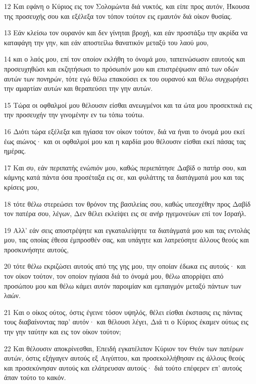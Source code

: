\par 12 Και εφάνη ο Κύριος εις τον Σολομώντα διά νυκτός, και είπε προς αυτόν, Ήκουσα της προσευχής σου και εξέλεξα τον τόπον τούτον εις εμαυτόν διά οίκον θυσίας.
\par 13 Εάν κλείσω τον ουρανόν και δεν γίνηται βροχή, και εάν προστάξω την ακρίδα να καταφάγη την γην, και εάν αποστείλω θανατικόν μεταξύ του λαού μου,
\par 14 και ο λαός μου, επί τον οποίον εκλήθη το όνομά μου, ταπεινώσωσιν εαυτούς και προσευχηθώσι και εκζητήσωσι το πρόσωπόν μου και επιστρέψωσιν από των οδών αυτών των πονηρών, τότε εγώ θέλω επακούσει εκ του ουρανού και θέλω συγχωρήσει την αμαρτίαν αυτών και θεραπεύσει την γην αυτών.
\par 15 Τώρα οι οφθαλμοί μου θέλουσιν είσθαι ανεωγμένοι και τα ώτα μου προσεκτικά εις την προσευχήν την γινομένην εν τω τόπω τούτω.
\par 16 Διότι τώρα εξέλεξα και ηγίασα τον οίκον τούτον, διά να ήναι το όνομά μου εκεί έως αιώνος· και οι οφθαλμοί μου και η καρδία μου θέλουσιν είσθαι εκεί πάσας τας ημέρας.
\par 17 Και συ, εάν περιπατής ενώπιόν μου, καθώς περιεπάτησε Δαβίδ ο πατήρ σου, και κάμνης κατά πάντα όσα προσέταξα εις σε, και φυλάττης τα διατάγματά μου και τας κρίσεις μου,
\par 18 τότε θέλω στερεώσει τον θρόνον της βασιλείας σου, καθώς υπεσχέθην προς Δαβίδ τον πατέρα σου, λέγων, Δεν θέλει εκλείψει εις σε ανήρ ηγεμονεύων επί τον Ισραήλ.
\par 19 Αλλ' εάν σεις αποστρέψητε και εγκαταλείψητε τα διατάγματά μου και τας εντολάς μου, τας οποίας έθεσα έμπροσθέν σας, και υπάγητε και λατρεύσητε άλλους θεούς και προσκυνήσητε αυτούς,
\par 20 τότε θέλω εκριζώσει αυτούς από της γης μου, την οποίαν έδωκα εις αυτούς· και τον οίκον τούτον, τον οποίον ηγίασα διά το όνομά μου, θέλω απορρίψει από προσώπου μου και θέλω κάμει αυτόν παροιμίαν και εμπαιγμόν μεταξύ πάντων των λαών.
\par 21 Και ο οίκος ούτος, όστις έγεινε τόσον υψηλός, θέλει είσθαι έκστασις εις πάντας τους διαβαίνοντας παρ' αυτόν· και θέλουσι λέγει, Διά τι ο Κύριος έκαμεν ούτως εις την γην ταύτην και εις τον οίκον τούτον;
\par 22 Και θέλουσιν αποκρίνεσθαι, Επειδή εγκατέλιπον Κύριον τον Θεόν των πατέρων αυτών, όστις εξήγαγεν αυτούς εξ Αιγύπτου, και προσεκολλήθησαν εις άλλους θεούς και προσεκύνησαν αυτούς και ελάτρευσαν αυτούς· διά τούτο επέφερεν επ' αυτούς άπαν τούτο το κακόν.


